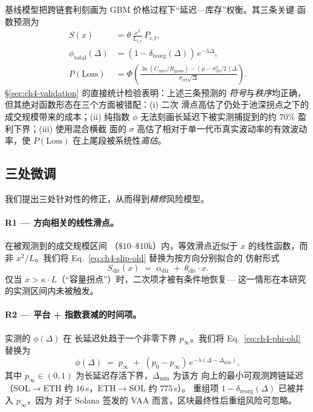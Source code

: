 \documentclass[sigconf,nonacm,10pt]{acmart}
\newcommand{\SolEth}{SOL$\to$ETH}
\newcommand{\EthSol}{ETH$\to$SOL}
\newcommand{\Cexec}{C_{\text{exec}}}
\newcommand{\Rgross}{R_{\text{gross}}}
\begin{document}
基线模型把跨链套利刻画为 GBM 价格过程下“延迟---库存”权衡。其三条关键
函数预测为
\begin{align}
    \label{eq:ch4-slip-old}
    S(x) &= \theta\,\frac{x^{2}}{L_{i,t}}\,P_{i,t}, \\
    \label{eq:ch4-phi-old}
    \phi_{\text{total}}(\Delta) &= (1-\delta_{\text{reorg}}(\Delta))\,
        e^{-\lambda\Delta}, \\
    \label{eq:ch4-ploss-old}
    P(\text{Loss}) &= \Phi\!\left(\frac{\ln(\Cexec/\Rgross) -
        (\mu - \sigma_{\text{eff}}^{2}/2)\Delta}
        {\sigma_{\text{eff}}\sqrt{\Delta}}\right).
\end{align}
\S\ref{sec:ch4-validation} 的直接统计检验表明：上述三条预测的\emph{
符号}与\emph{秩序}均正确，但其绝对函数形态在三个方面被错配：(i) 二次
滑点高估了仍处于池深拐点之下的成交规模带来的成本；(ii) 纯指数 $\phi$
无法刻画长延迟下被实测捕捉到的约 $70\%$ 盈利下界；(iii) 使用混合横截
面的 $\sigma$ 高估了相对于单一代币真实波动率的有效波动率，使
$P(\text{Loss})$ 在上尾段被系统性\emph{高估}。

\subsection{三处微调}

我们提出三处针对性的修正，从而得到\textit{精修}风险模型。

\paragraph{R1 --- 方向相关的线性滑点。} 在被观测到的成交规模区间
（$\$10$--$\$10$k）内，等效滑点近似于 $x$ 的线性函数，而非
$x^{2}/L$。我们将 Eq.~\eqref{eq:ch4-slip-old} 替换为按方向分别拟合的
仿射形式
\begin{equation}
\label{eq:ch4-slip-new}
    S_{\text{dir}}(x) \;=\; \alpha_{\text{dir}} \;+\; \theta_{\text{dir}}\cdot x.
\end{equation}
仅当 $x > \kappa\cdot L$（“容量拐点”）时，二次项才被有条件地恢复---
这一情形在本研究的实测区间内未被触发。

\paragraph{R2 --- 平台 + 指数衰减的时间项。} 实测的 $\phi(\Delta)$ 在
长延迟处趋于一个非零下界 $p_{\infty}$。我们将 Eq.~\eqref{eq:ch4-phi-old}
替换为
\begin{equation}
\label{eq:ch4-phi-new}
    \phi(\Delta) \;=\; p_{\infty} \;+\;
        (p_{0} - p_{\infty})\,e^{-\lambda(\Delta-\Delta_{\min})},
\end{equation}
其中 $p_{\infty} \in (0,1)$ 为长延迟存活下界，$\Delta_{\min}$ 为该方
向上的最小可观测跨链延迟（\SolEth{} 约 $16$\,s，\EthSol{} 约 $775$\,s）。
重组项 $1-\delta_{\text{reorg}}(\Delta)$ 已被并入 $p_{\infty}$，因为
对于 Solana 签发的 VAA 而言，区块最终性后重组风险可忽略。
\end{document}
